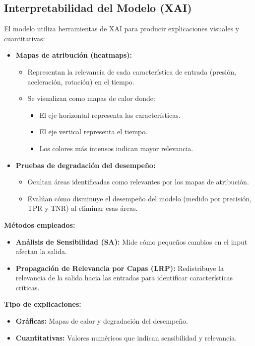 \documentclass{report}
\begin{document}
\subsection{Interpretabilidad del Modelo (XAI)}

El modelo utiliza herramientas de XAI para producir explicaciones visuales y cuantitativas:

\begin{itemize}
    \item \textbf{Mapas de atribución (heatmaps):}
    \begin{itemize}
        \item Representan la relevancia de cada característica de entrada (presión, aceleración, rotación) en el tiempo.
        \item Se visualizan como mapas de calor donde:
        \begin{itemize}
            \item El eje horizontal representa las características.
            \item El eje vertical representa el tiempo.
            \item Los colores más intensos indican mayor relevancia.
        \end{itemize}
    \end{itemize}
    \item \textbf{Pruebas de degradación del desempeño:}
    \begin{itemize}
        \item Ocultan áreas identificadas como relevantes por los mapas de atribución.
        \item Evalúan cómo disminuye el desempeño del modelo (medido por precisión, TPR y TNR) al eliminar esas áreas.
    \end{itemize}
\end{itemize}

\textbf{Métodos empleados:}
\begin{itemize}
    \item \textbf{Análisis de Sensibilidad (SA):} Mide cómo pequeños cambios en el input afectan la salida.
    \item \textbf{Propagación de Relevancia por Capas (LRP):} Redistribuye la relevancia de la salida hacia las entradas para identificar características críticas.
\end{itemize}

\textbf{Tipo de explicaciones:}
\begin{itemize}
    \item \textbf{Gráficas:} Mapas de calor y degradación del desempeño.
    \item \textbf{Cuantitativas:} Valores numéricos que indican sensibilidad y relevancia.
\end{itemize}
\end{document}
